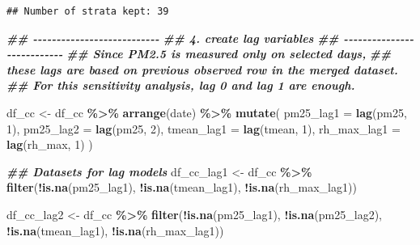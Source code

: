 \documentclass[
]{article}
\newenvironment{Shaded}{\begin{snugshade}}{\end{snugshade}}
\newcommand{\AttributeTok}[1]{\textcolor[rgb]{0.13,0.29,0.53}{#1}}
\newcommand{\DecValTok}[1]{\textcolor[rgb]{0.00,0.00,0.81}{#1}}
\newcommand{\DocumentationTok}[1]{\textcolor[rgb]{0.56,0.35,0.01}{\textbf{\textit{#1}}}}
\newcommand{\FunctionTok}[1]{\textcolor[rgb]{0.13,0.29,0.53}{\textbf{#1}}}
\newcommand{\NormalTok}[1]{#1}
\newcommand{\OtherTok}[1]{\textcolor[rgb]{0.56,0.35,0.01}{#1}}
\newcommand{\SpecialCharTok}[1]{\textcolor[rgb]{0.81,0.36,0.00}{\textbf{#1}}}
\begin{document}
\begin{verbatim}
## Number of strata kept: 39
\end{verbatim}

\begin{Shaded}
\begin{Highlighting}[]
\DocumentationTok{\#\# {-}{-}{-}{-}{-}{-}{-}{-}{-}{-}{-}{-}{-}{-}{-}{-}{-}{-}{-}{-}{-}{-}{-}{-}{-}{-}{-}}
\DocumentationTok{\#\# 4. create lag variables}
\DocumentationTok{\#\# {-}{-}{-}{-}{-}{-}{-}{-}{-}{-}{-}{-}{-}{-}{-}{-}{-}{-}{-}{-}{-}{-}{-}{-}{-}{-}{-}}
\DocumentationTok{\#\# Since PM2.5 is measured only on selected days,}
\DocumentationTok{\#\# these lags are based on previous observed row in the merged dataset.}
\DocumentationTok{\#\# For this sensitivity analysis, lag 0 and lag 1 are enough.}

\NormalTok{df\_cc }\OtherTok{\textless{}{-}}\NormalTok{ df\_cc }\SpecialCharTok{\%\textgreater{}\%}
  \FunctionTok{arrange}\NormalTok{(date) }\SpecialCharTok{\%\textgreater{}\%}
  \FunctionTok{mutate}\NormalTok{(}
    \AttributeTok{pm25\_lag1 =} \FunctionTok{lag}\NormalTok{(pm25, }\DecValTok{1}\NormalTok{),}
    \AttributeTok{pm25\_lag2 =} \FunctionTok{lag}\NormalTok{(pm25, }\DecValTok{2}\NormalTok{),}
    \AttributeTok{tmean\_lag1 =} \FunctionTok{lag}\NormalTok{(tmean, }\DecValTok{1}\NormalTok{),}
    \AttributeTok{rh\_max\_lag1 =} \FunctionTok{lag}\NormalTok{(rh\_max, }\DecValTok{1}\NormalTok{)}
\NormalTok{  )}

\DocumentationTok{\#\# Datasets for lag models}
\NormalTok{df\_cc\_lag1 }\OtherTok{\textless{}{-}}\NormalTok{ df\_cc }\SpecialCharTok{\%\textgreater{}\%}
  \FunctionTok{filter}\NormalTok{(}\SpecialCharTok{!}\FunctionTok{is.na}\NormalTok{(pm25\_lag1), }\SpecialCharTok{!}\FunctionTok{is.na}\NormalTok{(tmean\_lag1), }\SpecialCharTok{!}\FunctionTok{is.na}\NormalTok{(rh\_max\_lag1))}

\NormalTok{df\_cc\_lag2 }\OtherTok{\textless{}{-}}\NormalTok{ df\_cc }\SpecialCharTok{\%\textgreater{}\%}
  \FunctionTok{filter}\NormalTok{(}\SpecialCharTok{!}\FunctionTok{is.na}\NormalTok{(pm25\_lag1), }\SpecialCharTok{!}\FunctionTok{is.na}\NormalTok{(pm25\_lag2),}
         \SpecialCharTok{!}\FunctionTok{is.na}\NormalTok{(tmean\_lag1), }\SpecialCharTok{!}\FunctionTok{is.na}\NormalTok{(rh\_max\_lag1))}
\end{Highlighting}
\end{Shaded}
\end{document}
